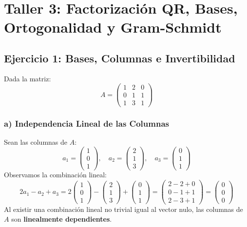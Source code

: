 \documentclass[11pt,a4paper]{article}
\theoremstyle{definition}
\theoremstyle{remark}
\begin{document}
\section{Taller 3: Factorización QR, Bases, Ortogonalidad y Gram-Schmidt}

\subsection{Ejercicio 1: Bases, Columnas e Invertibilidad}
Dada la matriz:
\begin{equation}
    A = \begin{pmatrix}
        1 & 2 & 0 \\
        0 & 1 & 1 \\
        1 & 3 & 1
    \end{pmatrix}
\end{equation}

\subsubsection{a) Independencia Lineal de las Columnas}
Sean las columnas de $A$:
\begin{equation}
    a_1 = \begin{pmatrix} 1 \\ 0 \\ 1 \end{pmatrix}, \quad
    a_2 = \begin{pmatrix} 2 \\ 1 \\ 3 \end{pmatrix}, \quad
    a_3 = \begin{pmatrix} 0 \\ 1 \\ 1 \end{pmatrix}
\end{equation}
Observamos la combinación lineal:
\begin{equation}
    2 a_1 - a_2 + a_3 = 2 \begin{pmatrix} 1 \\ 0 \\ 1 \end{pmatrix} - \begin{pmatrix} 2 \\ 1 \\ 3 \end{pmatrix} + \begin{pmatrix} 0 \\ 1 \\ 1 \end{pmatrix} = \begin{pmatrix} 2 - 2 + 0 \\ 0 - 1 + 1 \\ 2 - 3 + 1 \end{pmatrix} = \begin{pmatrix} 0 \\ 0 \\ 0 \end{pmatrix}
\end{equation}
Al existir una combinación lineal no trivial igual al vector nulo, las columnas de $A$ son \textbf{linealmente dependientes}.
\end{document}
